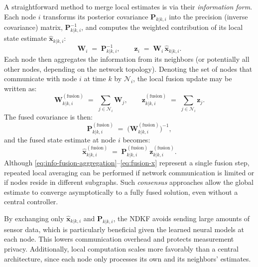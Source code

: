 \documentclass[letterpaper, 10 pt, conference]{ieeeconf}
\begin{document}
A straightforward method to merge local estimates is via their \emph{information form}. Each node $i$ transforms its posterior covariance $\mathbf{P}_{k|k,i}$ into the precision (inverse covariance) matrix, $\mathbf{P}_{k|k,i}^{-1}$, and computes the weighted contribution of its local state estimate $\hat{\mathbf{x}}_{k|k,i}$:
\begin{equation}
    \mathbf{W}_i \;=\; \mathbf{P}_{k|k,i}^{-1}, 
    \qquad
    \mathbf{z}_i \;=\; \mathbf{W}_i\,\hat{\mathbf{x}}_{k|k,i}.
    \label{eq:info-fusion-contrib}
\end{equation}
Each node then aggregates the information from its neighbors (or potentially all other nodes, depending on the network topology). Denoting the set of nodes that communicate with node $i$ at time $k$ by $\mathcal{N}_i$, the local fusion update may be written as:
\begin{equation}
    \mathbf{W}_{k|k,i}^{(\mathrm{fusion})} \;=\; \sum_{j \in \mathcal{N}_i} \mathbf{W}_j,
    \qquad
    \mathbf{z}_{k|k,i}^{(\mathrm{fusion})} \;=\; \sum_{j \in \mathcal{N}_i} \mathbf{z}_j.
    \label{eq:info-fusion-aggregation}
\end{equation}
The fused covariance is then:
\begin{equation}
    \mathbf{P}_{k|k,i}^{(\mathrm{fusion})} \;=\; \bigl(\mathbf{W}_{k|k,i}^{(\mathrm{fusion})}\bigr)^{-1},
    \label{eq:fusion-P}
\end{equation}
and the fused state estimate at node $i$ becomes:
\begin{equation}
    \hat{\mathbf{x}}_{k|k,i}^{(\mathrm{fusion})} \;=\; 
    \mathbf{P}_{k|k,i}^{(\mathrm{fusion})}\,\mathbf{z}_{k|k,i}^{(\mathrm{fusion})}.
    \label{eq:fusion-x}
\end{equation}
Although \eqref{eq:info-fusion-aggregation}--\eqref{eq:fusion-x} represent a single fusion step, repeated local averaging can be performed if network communication is limited or if nodes reside in different subgraphs. Such \emph{consensus} approaches allow the global estimate to converge asymptotically to a fully fused solution, even without a central controller.

By exchanging only $\hat{\mathbf{x}}_{k|k,i}$ and $\mathbf{P}_{k|k,i}$, the NDKF avoids sending large amounts of sensor data, which is particularly beneficial given the learned neural models at each node. This lowers communication overhead and protects measurement privacy. Additionally, local computation scales more favorably than a central architecture, since each node only processes its own and its neighbors’ estimates.
\end{document}
